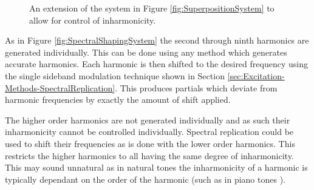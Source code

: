 \begin{figure}[h!]
			\caption{An extension of the system in Figure \ref{fig:SuperpositionSystem} to allow for control
			         of inharmonicity.}
			\label{fig:InharmonicitySystem}
		\end{figure}

		As in Figure \ref{fig:SpectralShapingSystem} the second through ninth harmonics are generated individually.
		This can be done using any method which generates accurate harmonics. Each harmonic is then shifted to the
		desired frequency using the single sideband modulation technique shown in Section
		\ref{sec:Excitation-Methods-SpectralReplication}. This produces partials which deviate from
		harmonic frequencies by exactly the amount of shift applied.

		The higher order harmonics are not generated individually and as such their inharmonicity cannot be
		controlled individually. Spectral replication could be used to shift their frequencies as is done with the
		lower order harmonics. This restricts the higher harmonics to all having the same degree of inharmonicity.
		This may sound unnatural as in natural tones the inharmonicity of a harmonic is typically dependant on the
		order of the harmonic (such as in piano tones \citep{young1952inharmonicity}).


